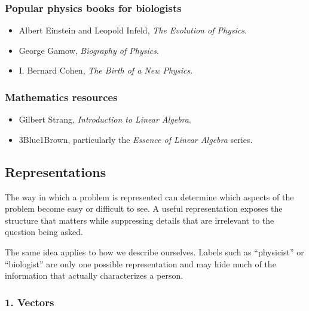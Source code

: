 \subsubsection{Popular physics books for biologists}

\begin{itemize}
    \item Albert Einstein and Leopold Infeld, \textit{The Evolution of Physics}.
    \item George Gamow, \textit{Biography of Physics}.
    \item I. Bernard Cohen, \textit{The Birth of a New Physics}.
\end{itemize}

\subsubsection{Mathematics resources}

\begin{itemize}
    \item Gilbert Strang, \textit{Introduction to Linear Algebra}.
    \item 3Blue1Brown, particularly the \textit{Essence of Linear Algebra} series.
\end{itemize}


\subsection{Representations}

The way in which a problem is represented can determine which aspects of the problem become easy or difficult to see.
A useful representation exposes the structure that matters while suppressing details that are irrelevant to the question being asked.

The same idea applies to how we describe ourselves.
Labels such as ``physicist'' or ``biologist'' are only one possible representation and may hide much of the information that actually characterizes a person.


\subsubsection{1. Vectors}

